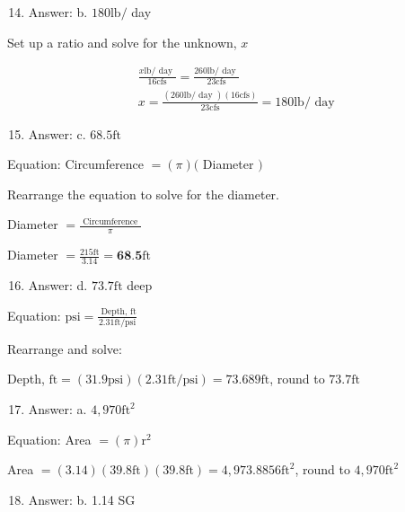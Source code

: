 \documentclass[10pt]{article}
\begin{document}
\begin{enumerate}
  \setcounter{enumi}{13}
  \item Answer: b. $180 \mathrm{lb} /$ day
\end{enumerate}

Set up a ratio and solve for the unknown, $x$

$$
\begin{aligned}
&\frac{x \mathrm{lb} / \text { day }}{16 \mathrm{cfs}}=\frac{260 \mathrm{lb} / \text { day }}{23 \mathrm{cfs}} \\
&x=\frac{(260 \mathrm{lb} / \text { day })(16 \mathrm{cfs})}{23 \mathrm{cfs}}=180 \mathrm{lb} / \text { day }
\end{aligned}
$$

\begin{enumerate}
  \setcounter{enumi}{14}
  \item Answer: c. $68.5 \mathrm{ft}$
\end{enumerate}

Equation: Circumference $=(\pi)($ Diameter $)$

Rearrange the equation to solve for the diameter.

Diameter $=\frac{\text { Circumference }}{\pi}$

Diameter $=\frac{215 \mathrm{ft}}{3.14}=\mathbf{6 8 . 5} \mathrm{ft}$

\begin{enumerate}
  \setcounter{enumi}{15}
  \item Answer: d. $73.7 \mathrm{ft}$ deep
\end{enumerate}

Equation: $\mathrm{psi}=\frac{\text { Depth, } \mathrm{ft}}{2.31 \mathrm{ft} / \mathrm{psi}}$

Rearrange and solve:

Depth, $\mathrm{ft}=(31.9 \mathrm{psi})(2.31 \mathrm{ft} / \mathrm{psi})=73.689 \mathrm{ft}$, round to $73.7 \mathrm{ft}$

\begin{enumerate}
  \setcounter{enumi}{16}
  \item Answer: a. $4,970 \mathrm{ft}^{2}$
\end{enumerate}

Equation: Area $=(\pi) \mathrm{r}^{2}$

Area $=(3.14)(39.8 \mathrm{ft})(39.8 \mathrm{ft})=4,973.8856 \mathrm{ft}^{2}$, round to $4,970 \mathrm{ft}^{2}$

\begin{enumerate}
  \setcounter{enumi}{17}
  \item Answer: b. 1.14 SG
\end{enumerate}
\end{document}
